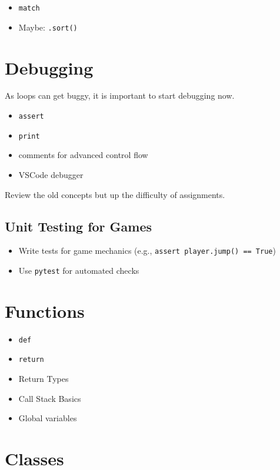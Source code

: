 \documentclass{article}
\begin{document}
\begin{itemize}
    \item \verb|match|
    \item Maybe: \verb|.sort()|
\end{itemize}

\section{Debugging}
As loops can get buggy, it is important to start debugging now.

\begin{itemize}
    \item \verb|assert|
    \item \verb|print|
    \item comments for advanced control flow
    \item VSCode debugger
\end{itemize} 

Review the old concepts but up the difficulty of assignments. 

\subsection{Unit Testing for Games}
\begin{itemize}
    \item Write tests for game mechanics (e.g., \verb|assert player.jump() == True|)
    \item Use \verb|pytest| for automated checks
\end{itemize}

\section{Functions}

\begin{itemize}
    \item \verb|def|
    \item \verb|return|
    \item Return Types
    \item Call Stack Basics
    \item Global variables
\end{itemize}

\section{Classes}
\end{document}

